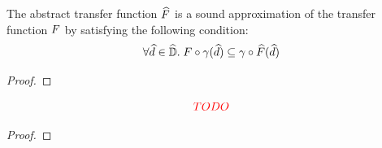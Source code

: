 \begin{lemma}
  The abstract transfer function $\widehat{F}$ is a sound approximation of the
  transfer function $F$ by satisfying the following condition:
  \[
    \forall \widehat{d} \in \widehat{\mathbb{D}}. \;
    F \circ \gamma(\widehat{d}) \subseteq \gamma \circ \widehat{F}(\widehat{d})
  \]
\end{lemma}
\begin{proof}
  \todo
\end{proof}

\begin{theorem}
  \[
    {\color{red}{TODO}}
  \]
\end{theorem}
\begin{proof}
  \todo
\end{proof}

\todo
